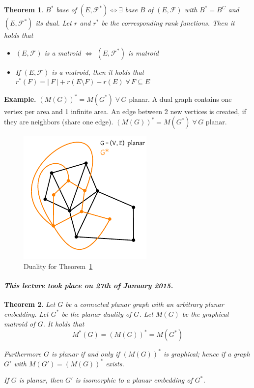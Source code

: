 \documentclass{article}
\newtheorem{theorem}{Theorem}
\newcommand{\card}[1]{\left|\:\!#1\:\!\right|}
\newcommand{\dateref}[1]{\paragraph{\textit{This lecture took place on #1.}}}
\newcommand{\fall}{\;\forall\,}
\begin{document}
\begin{theorem}
  \label{corollary-8.10}
  \label{satz-8.10}
  $B^*$ base of $(E, \mathcal{F}^*) \Leftrightarrow \exists$ base $B$ of $(E, \mathcal{F})$ with $B^* = B^C$ and $(E, \mathcal{F}^*)$ its dual. Let $r$ and $r^*$ be the corresponding rank functions.
  Then it holds that
  \begin{itemize}
    \item[a)] $(E, \mathcal{F})$ is a matroid $\Leftrightarrow$ $(E, \mathcal{F}^*)$ is matroid
    \item[b)] If $(E, \mathcal{F})$ is a matroid, then it holds that $r^*(F) = \card{F} + r(E \setminus F) - r(E) \fall F \subseteq E$
  \end{itemize}
\end{theorem}

\textbf{Example.}
  $(M(G))^* = M(G^*) \fall G$ planar. A dual graph contains one vertex per area and 1 infinite area. An edge between 2 new vertices is created, if they are neighbors (share one edge). $(M(G))^* = M(G^*) \fall G \text{ planar}$.
  \begin{figure}[!ht]
    \begin{center}
      \includegraphics{img/duality.pdf}
      \caption{Duality for Theorem~\ref{corollary-8.10}}
    \end{center}
  \end{figure}


\dateref{27th of January 2015}

\begin{theorem}
  \label{satz-8.11}
  Let $G$ be a connected planar graph with an arbitrary planar embedding.
  Let $G^*$ be the planar duality of $G$. Let $M(G)$ be the graphical matroid of $G$.
  It holds that
    \[ M^*(G) = (M(G))^* = M(G^*) \]

  Furthermore $G$ is planar if and only if $(M(G))^*$ is graphical;
  hence if a graph $G'$ with $M(G') = (M(G))^*$ exists.

  If $G$ is planar, then $G'$ is isomorphic to a planar embedding of $G^*$.
\end{theorem}
\end{document}
